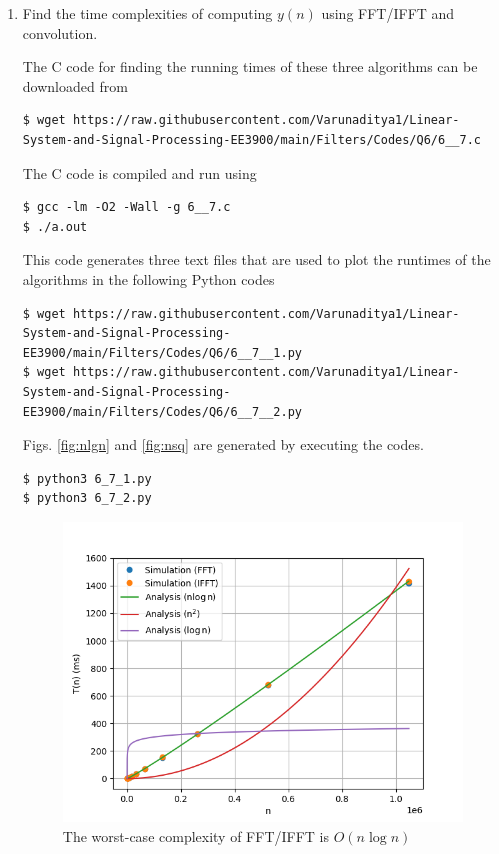 \documentclass[journal,12pt,twocolumn]{IEEEtran}
\renewcommand\thesection{\arabic{section}}
\begin{document}
\begin{enumerate}[label=\thesection.\arabic*]
\item Find the time complexities of computing $y(n)$ using FFT/IFFT and convolution.

\solution The C code for finding the running times of these three algorithms can be downloaded from
\begin{lstlisting}
$ wget https://raw.githubusercontent.com/Varunaditya1/Linear-System-and-Signal-Processing-EE3900/main/Filters/Codes/Q6/6__7.c
\end{lstlisting}
The C code is compiled and run using
\begin{lstlisting}
$ gcc -lm -O2 -Wall -g 6__7.c
$ ./a.out
\end{lstlisting}
This code generates three text files that are used to plot the runtimes of the algorithms in the following Python codes
\begin{lstlisting}
$ wget https://raw.githubusercontent.com/Varunaditya1/Linear-System-and-Signal-Processing-EE3900/main/Filters/Codes/Q6/6__7__1.py
$ wget https://raw.githubusercontent.com/Varunaditya1/Linear-System-and-Signal-Processing-EE3900/main/Filters/Codes/Q6/6__7__2.py
\end{lstlisting}
Figs. \eqref{fig:nlgn} and \eqref{fig:nsq} are generated by executing the codes.
\begin{lstlisting}
$ python3 6_7_1.py 
$ python3 6_7_2.py 
\end{lstlisting}

\begin{figure}[!htb]
	\includegraphics[width=\columnwidth]{Figures/Q6/6__7__1.png}
	\caption{The worst-case complexity of FFT/IFFT is $O(n\log{n})$}
	\label{fig:nlgn}
\end{figure}


\end{enumerate}
\end{document}
